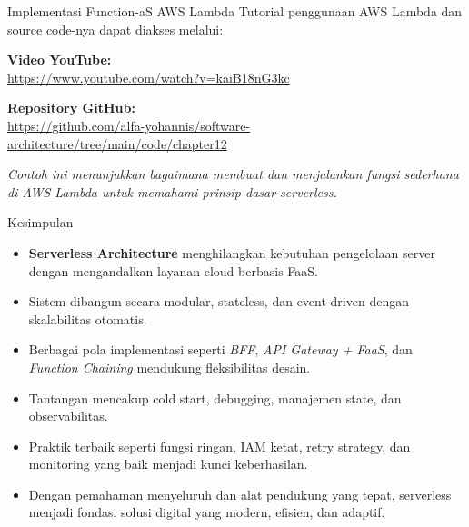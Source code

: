 \documentclass[aspectratio=169, table]{beamer}
\begin{document}
\begin{frame}[fragile]{Implementasi Function-aS AWS Lambda}
	\vspace{10pt}
	Tutorial penggunaan AWS Lambda dan source code-nya dapat diakses melalui:
	
	\vspace{10pt}
	\textbf{Video YouTube:}\\
	\url{https://www.youtube.com/watch?v=kaiB18nG3kc}
	
	\vspace{10pt}
	\textbf{Repository GitHub:}\\
	\url{https://github.com/alfa-yohannis/software-architecture/tree/main/code/chapter12}
	
	\vspace{10pt}
	\scriptsize
	\textit{Contoh ini menunjukkan bagaimana membuat dan menjalankan fungsi sederhana di AWS Lambda untuk memahami prinsip dasar serverless.}
\end{frame}

\begin{frame}[fragile]{Kesimpulan}
	\vspace{10pt}
	\begin{itemize}
		\item \textbf{Serverless Architecture} menghilangkan kebutuhan pengelolaan server dengan mengandalkan layanan cloud berbasis FaaS.
		\item Sistem dibangun secara modular, stateless, dan event-driven dengan skalabilitas otomatis.
		\item Berbagai pola implementasi seperti \textit{BFF}, \textit{API Gateway + FaaS}, dan \textit{Function Chaining} mendukung fleksibilitas desain.
		\item Tantangan mencakup cold start, debugging, manajemen state, dan observabilitas.
		\item Praktik terbaik seperti fungsi ringan, IAM ketat, retry strategy, dan monitoring yang baik menjadi kunci keberhasilan.
		\item Dengan pemahaman menyeluruh dan alat pendukung yang tepat, serverless menjadi fondasi solusi digital yang modern, efisien, dan adaptif.
	\end{itemize}
\end{frame}
\end{document}
